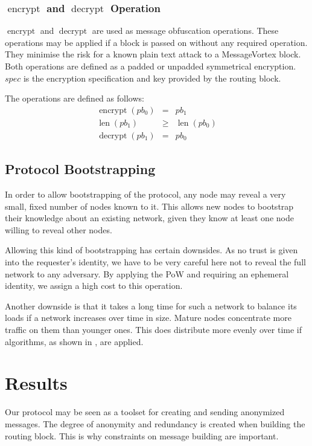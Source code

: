\documentclass[runningheads]{llncs}
\DeclareMathOperator{\len}{len}
\DeclareMathOperator{\encrypt}{encrypt}
\DeclareMathOperator{\decrypt}{decrypt}
\begin{document}
\subsubsection{$\encrypt$ and $\decrypt$ Operation}
$\encrypt$ and $\decrypt$ are used as message obfuscation operations. These operations may be applied if a block is passed on without any required operation. They minimise the risk for a known plain text attack to a MessageVortex block. Both operations are defined as a padded or unpadded symmetrical encryption. $spec$ is the encryption specification and key provided by the routing block.

The operations are defined as follows:
\begin{eqnarray}
\encrypt(pb_0) & = & pb_1 \\
\len(pb_1) & \geq & \len(pb_0)\\
\decrypt(pb_1) & = & pb_0
\end{eqnarray}

\subsection{Protocol Bootstrapping}
In order to allow bootstrapping of the protocol, any node may reveal a very small, fixed number of nodes known to it. This allows new nodes to bootstrap their knowledge about an existing network, given they know at least one node willing to reveal other nodes. 

Allowing this kind of bootstrapping has certain downsides. As no trust is given into the requester's identity, we have to be very careful here not to reveal the full network to any adversary. By applying the PoW and requiring an ephemeral identity, we assign a high cost to this operation. 

Another downside is that it takes a long time for such a network to balance its loads if a network increases over time in size. Mature nodes concentrate more traffic on them than younger ones. This does distribute more evenly over time if algorithms, as shown in \cite{messageVortex}, are applied.

\section{Results}
Our protocol may be seen as a toolset for creating and sending anonymized messages. The degree of anonymity and redundancy is created when building the routing block. This is why constraints on message building are important.
\end{document}
